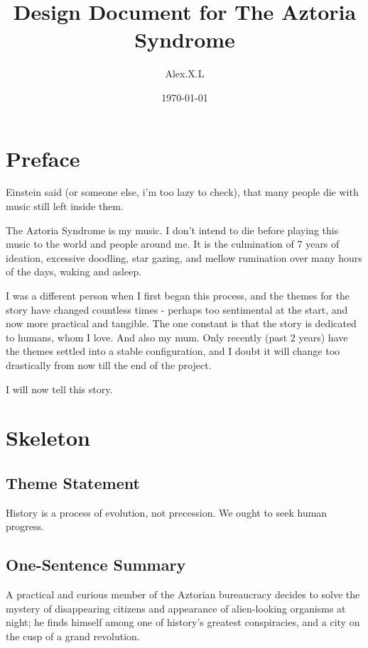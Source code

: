 \documentclass[11pt]{article}
\begin{document}
\begin{titlepage}
\title{Design Document for The Aztoria Syndrome}
\author{Alex.X.L}
\date{\today} %
\maketitle
\thispagestyle{empty} %
\end{titlepage}


\tableofcontents
\newpage %






\section{Preface}
Einstein said (or someone else, i'm too lazy to check), that many people die with music still left inside them.

The Aztoria Syndrome is my music. 
I don't intend to die before playing this music to the world and people around me. 
It is the culmination of 7 years of ideation, excessive doodling, star gazing, and mellow rumination over many hours of the days, waking and asleep.

I was a different person when I first began this process, and the themes for the story have changed countless times - perhaps too sentimental at the start, and now more practical and tangible.
The one constant is that the story is dedicated to humans, whom I love. 
And also my mum. 
Only recently (past 2 years) have the themes settled into a stable configuration, and I doubt it will change too drastically from now till the end of the project.

I will now tell this story.
\newpage




\section{Skeleton}
	\subsection{Theme Statement}
	History is a process of evolution, not precession.
	We ought to seek human progress.
	\subsection{One-Sentence Summary}
	A practical and curious member of the Aztorian bureaucracy decides to solve the mystery of disappearing citizens and appearance of alien-looking organisms at night; he finds himself among one of history's greatest conspiracies, and a city on the cusp of a grand revolution.
\end{document}
